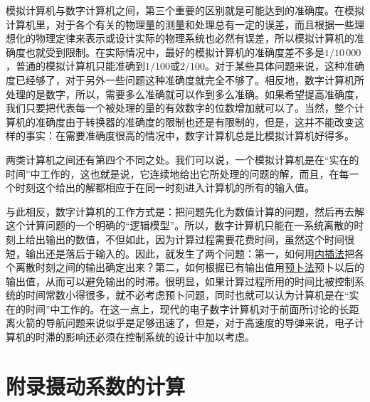 模拟计算机与数字计算机之间，第三个重要的区别就是可能达到的准确度。在模拟计算机里，对于各个有关的物理量的测量和处理总有一定的误差，而且根据一些理想化的物理定律来表示或设计实际的物理系统也必然有误差，所以模拟计算机的准确度也就受到限制。在实际情况中，最好的模拟计算机的准确度差不多是$1/10\,000$，普通的模拟计算机只能准确到$1/100$或$2/100$。对于某些具体问题来说，这种准确度已经够了，对于另外一些问题这种准确度就完全不够了。相反地，数字计算机所处理的是数字，所以，需要多么准确就可以作到多么准确。如果希望提高准确度，我们只要把代表每一个被处理的量的有效数字的位数增加就可以了。当然，整个计算机的准确度由于转换器的准确度的限制也还是有限制的，但是，这并不能改变这样的事实：在需要准确度很高的情况中，数字计算机总是比模拟计算机好得多。

两类计算机之间还有第四个不同之处。我们可以说，一个模拟计算机是在“实在的时间”中工作的，这也就是说，它连续地给出它所处理的问题的解，而且，在每一个时刻这个给出的解都相应于在同一时刻进入计算机的所有的输入值。

与此相反，数字计算机的工作方式是：把问题先化为数值计算的问题，然后再去解这个计算问题的一个明确的“逻辑模型”。所以，数字计算机只能在一系统离散的时刻上给出输出的数值，不但如此，因为计算过程需要花费时间，虽然这个时间很短，输出还是落后于输入的。因此，就发生了两个问题：第一，如何用\underline{内插法}把各个离散时刻之间的输出确定出来？第二，如何根据已有输出值用\underline{预卜法}预卜以后的输出值，从而可以避免输出的时滞。很明显，如果计算过程所用的时间比被控制系统的时间常数小得很多，就不必考虑预卜问题，同时也就可以认为计算机是在“实在的时间”中工作的。在这一点上，现代的电子数字计算机对于前面所讨论的长距离火箭的导航问题来说似乎是足够迅速了，但是，对于高速度的导弹来说，电子计算机的时滞的影响还必须在控制系统的设计中加以考虑。


\section*{附录\qquad 摄动系数的计算}

